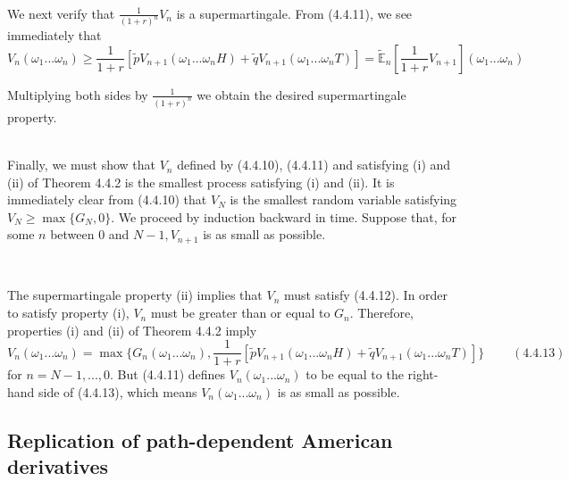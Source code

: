 \documentclass[c, dvipsnames, 8pt]{beamer}
\begin{document}
\begin{frame}[shrink=5]

\frametitle{\insertsection} 
\framesubtitle{\insertsubsection} 

\

We next verify that $\frac{1}{(1+r)^n}V_n$ is a supermartingale. From (4.4.11), we see immediately that 
\begin{equation}\label{key}
V_n(\omega_1...\omega_n)\ge \frac{1}{1+r}\left[\tilde{p}V_{n+1}(\omega_1...\omega_nH)+\tilde{q}V_{n+1}(\omega_1...\omega_nT)\right] =\widetilde{\mathbb{E}}_{n}\left[\frac{1}{1+r}V_{n+1}\right](\omega_1...\omega_n)\end{equation}

Multiplying both sides by $\frac{1}{(1+r)^n}$ we obtain the desired supermartingale property.\\

\

Finally, we must show that $V_n$ defined by (4.4.10), (4.4.11) and satisfying (i) and (ii) of Theorem 4.4.2 is the smallest process satisfying (i) and (ii). It is immediately clear from (4.4.10) that $V_N$ is the smallest random variable satisfying $V_N \ge \max\{G_N,0\}$. We proceed by induction backward in time. Suppose that, for some $n$ between $0$ and $N-1, V_{n+1}$ is as small as possible.

\

The supermartingale property (ii) implies that $V_n$ must satisfy (4.4.12). In order to satisfy property (i), $V_n$ must be greater than or equal to $G_n$. Therefore, properties (i) and (ii) of Theorem 4.4.2 imply
\begin{equation*}\label{key}
V_n(\omega_1...\omega_n)=\max\{G_n(\omega_1...\omega_n),
\frac{1}{1+r}\left[\tilde{p}V_{n+1}(\omega_1...\omega_nH)+\tilde{q}V_{n+1}(\omega_1...\omega_nT)\right]\} \ \ \ \ \ \  \ \ \ \ (4.4.13)
\end{equation*}
for $n=N-1,...,0$. But (4.4.11) defines $V_n(\omega_1...\omega_n)$ to be equal to the right-hand side of (4.4.13), which means $V_n(\omega_1...\omega_n)$ is as small as possible. 

\end{frame}





\subsection{Replication of path-dependent American derivatives}
\end{document}
